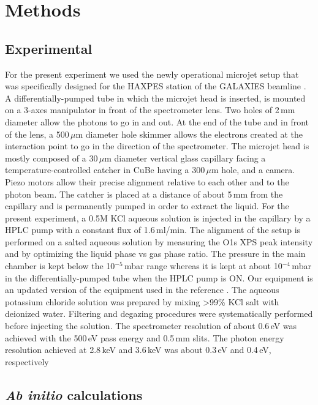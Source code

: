 \section{Methods} \label{sec:methods}
\subsection{Experimental}

For the present experiment we used the newly operational microjet setup that was specifically designed for the HAXPES station of the GALAXIES beamline \citep{ceolin13:188,rueff15:175}. A differentially-pumped tube in which the microjet head is inserted, is mounted on a 3-axes manipulator in front of the spectrometer lens. Two holes of 2\,mm diameter allow the photons to go in and out. At the end of the tube and in front of the lens, a 500\,$\mu$m diameter hole skimmer allows the electrons created at the interaction point to go in the direction of the spectrometer. The microjet head is mostly composed of a 30\,$\mu$m diameter vertical glass capillary facing a temperature-controlled catcher in CuBe having a 300\,$\mu$m hole, and a camera. Piezo motors allow their precise alignment relative to each other and to the photon beam. The catcher is placed at a distance of about 5\,mm from the capillary and is permanently pumped in order to extract the liquid. For the present experiment, a 0.5M KCl aqueous solution is injected in the capillary by a HPLC pump with a constant flux of 1.6\,ml/min. The alignment of the setup is performed on a salted aqueous solution by measuring the O1s XPS peak intensity and by optimizing the liquid phase vs gas phase ratio. The pressure in the main chamber is kept below the 10$^{-5}$\,mbar range whereas it is kept at about 10$^{-4}$\,mbar in the differentially-pumped tube when the HPLC pump is ON. Our equipment is an updated version of the equipment used in the reference \cite{faubel88:269}. The aqueous potassium chloride solution was prepared by mixing >99\% KCl salt with deionized water. Filtering and degazing procedures were systematically performed before injecting the solution. The spectrometer resolution of about 0.6\,eV was achieved with the 500\,eV pass energy and 0.5\,mm slits. The photon energy resolution achieved at 2.8\,keV and 3.6\,keV was about 0.3\,eV and 0.4\,eV, respectively


\subsection{{\bf{\it Ab initio}} calculations}

